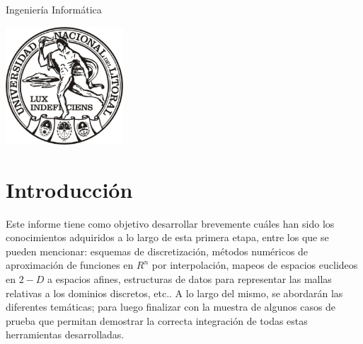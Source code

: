 \begin{titlepage}


  {\large
    Ingeniería Informática}\\[1cm] %
  
  \begin{center}
    \includegraphics[width=0.33\textwidth]{logo_unl.eps}\\[1cm] %
  \end{center}

  \vfill %
\end{titlepage}



\section{Introducción}

Este informe tiene como objetivo desarrollar brevemente cuáles han
sido los conocimientos adquiridos a lo largo de esta primera etapa, entre los que se pueden mencionar: esquemas de discretización, métodos
numéricos de aproximación de funciones en $ R^n$ por interpolación, mapeos de espacios euclideos en $2-D$ a espacios afines, estructuras de datos para representar las mallas relativas a los dominios discretos, etc.. A lo largo del mismo, se abordarán las diferentes temáticas; para luego finalizar con la muestra de algunos casos de prueba que permitan demostrar la correcta integración de todas estas herramientas desarrolladas.



